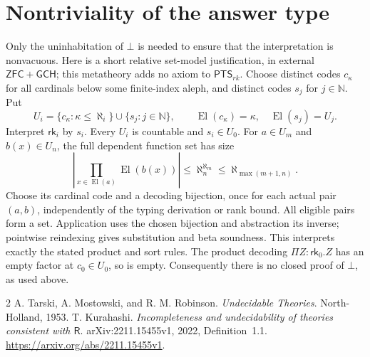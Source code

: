 \documentclass[11pt,a4paper]{article}
\newcommand{\rk}[1]{\mathsf{rk}_{#1}}
\newcommand{\PTS}{\mathsf{PTS}_{rk}}
\theoremstyle{remark}\newtheorem*{remark}{Remark}
\begin{document}
\section{Nontriviality of the answer type}\label{sec:empty}
Only the uninhabitation of $\bot$ is needed to ensure that the interpretation
is nonvacuous. Here is a short relative set-model justification, in external
$\mathsf{ZFC}+\mathsf{GCH}$; this metatheory adds no axiom to $\PTS$.
Choose distinct codes $c_\kappa$ for all cardinals below some finite-index
aleph, and distinct codes $s_j$ for $j\in\mathbb N$. Put
\[
 U_i=\{c_\kappa:\kappa\leq\aleph_i\}\cup\{s_j:j\in\mathbb N\},\qquad
 \operatorname{El}(c_\kappa)=\kappa,\quad
 \operatorname{El}(s_j)=U_j.
\]
Interpret $\rk i$ by $s_i$. Every $U_i$ is countable and $s_i\in U_0$.
For $a\in U_m$ and $b(x)\in U_n$, the full dependent function set has size
\[
 \left|\prod_{x\in\operatorname{El}(a)}\operatorname{El}(b(x))\right|
 \leq\aleph_n^{\aleph_m}\leq\aleph_{\max(m+1,n)}.
\]
Choose its cardinal code and a decoding bijection, once for each actual pair
$(a,b)$, independently of the typing derivation or rank bound. All eligible
pairs form a set. Application uses the chosen bijection and abstraction its
inverse; pointwise reindexing gives substitution and beta soundness. This
interprets exactly the stated product and sort rules. The product decoding
$\Pi Z:\rk0.Z$ has an empty factor at $c_0\in U_0$, so is empty. Consequently
there is no closed proof of $\bot$, as used above.

\begin{thebibliography}{2}\small
{}
A. Tarski, A. Mostowski, and R. M. Robinson.
\emph{Undecidable Theories}. North-Holland, 1953.
T. Kurahashi.
\emph{Incompleteness and undecidability of theories consistent with
$\mathsf R$}. arXiv:2211.15455v1, 2022, Definition~1.1.
\url{https://arxiv.org/abs/2211.15455v1}.
\end{thebibliography}
\end{document}
